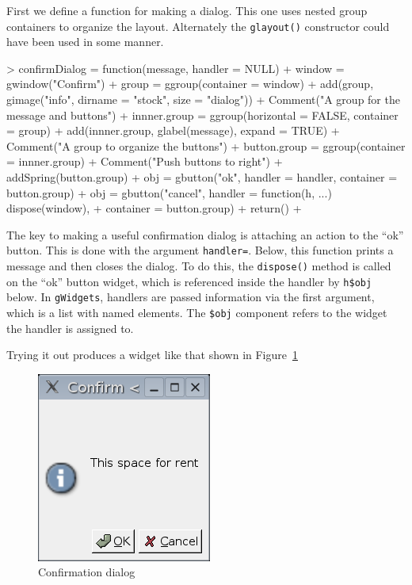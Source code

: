 \documentclass[12pt]{article}
\newcommand{\RCode}[1]{\texttt{#1}}
\newcommand{\RFunc}[1]{\texttt{#1()}}
\newcommand{\RArg}[1]{\texttt{#1=}}
\newcommand{\RListel}[1]{\texttt{\$#1}}
\begin{document}
First we define a function for making a dialog. This one uses
nested group containers to organize the layout. Alternately the
\RFunc{glayout} constructor could have been used in some manner.

\begin{Schunk}
\begin{Sinput}
> confirmDialog = function(message, handler = NULL) {
+     window = gwindow("Confirm")
+     group = ggroup(container = window)
+     add(group, gimage("info", dirname = "stock", size = "dialog"))
+     Comment("A group for the message and buttons")
+     innner.group = ggroup(horizontal = FALSE, container = group)
+     add(innner.group, glabel(message), expand = TRUE)
+     Comment("A group to organize the buttons")
+     button.group = ggroup(container = innner.group)
+     Comment("Push buttons to right")
+     addSpring(button.group)
+     obj = gbutton("ok", handler = handler, container = button.group)
+     obj = gbutton("cancel", handler = function(h, ...) dispose(window), 
+         container = button.group)
+     return()
+ }
\end{Sinput}
\end{Schunk}

The key to making a useful confirmation dialog is attaching an action
to the ``ok'' button. This is done with the argument
\RArg{handler}. Below, this function prints a message and then
closes the dialog. To do this, the \RFunc{dispose} method is called on
the ``ok'' button  widget, which is referenced inside the handler by
\RCode{h\$obj} below. In \RCode{gWidgets}, handlers are passed
information via the first argument, which is a list with named
elements. The \RListel{obj} component refers to the widget the handler
is assigned to. 

Trying it out produces a widget like that shown in Figure~\ref{fig:confirmDialog}

\begin{figure}[htbp]
  \centering
  \includegraphics[width=.35\textwidth]{confirmDialog}
  \caption{Confirmation dialog}
  \label{fig:confirmDialog}
\end{figure}
\end{document}
